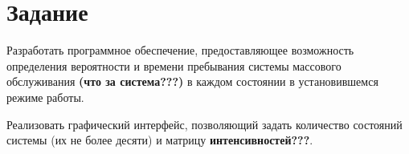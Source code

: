 \chapter{Задание}

Разработать программное обеспечение, предоставляющее возможность определения
вероятности и времени пребывания системы массового обслуживания \textbf{(что за
система???)} в каждом состоянии в установившемся режиме работы. 

Реализовать графический интерфейс, позволяющий задать количество состояний
системы (их не более десяти) и матрицу \textbf{интенсивностей???}.

